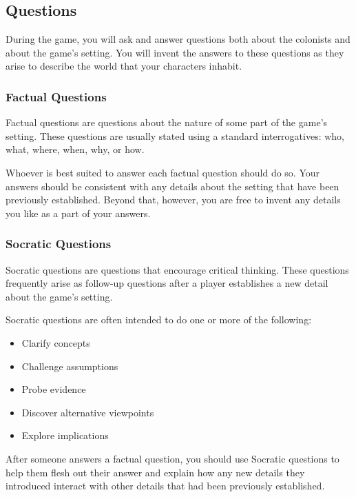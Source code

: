 \documentclass[a6paper, 11pt, parskip=half, DIV=15]{scrartcl}
\begin{document}
\newpage
\enlargethispage{1.75\baselineskip}

\subsection*{Questions}
During the game, you will ask and answer questions both about the colonists and about the game's setting.
You will invent the answers to these questions as they arise to describe the world that your characters inhabit.

\subsubsection*{Factual Questions}
Factual questions are questions about the nature of some part of the game's setting.
These questions are usually stated using a standard interrogatives: who, what, where, when, why, or how.

Whoever is best suited to answer each factual question should do so.
Your answers should be consistent with any details about the setting that have been previously established.
Beyond that, however, you are free to invent any details you like as a part of your answers.

\newpage
\enlargethispage{1.75\baselineskip}

\subsubsection*{Socratic Questions}
Socratic questions are questions that encourage critical thinking.
These questions frequently arise as follow-up questions after a player establishes a new detail about the game's setting.

Socratic questions are often intended to do one or more of the following:
\begin{itemize}[nosep]
	\item Clarify concepts
	\item Challenge assumptions
	\item Probe evidence
	\item Discover alternative viewpoints
	\item Explore implications
\end{itemize}

After someone answers a factual question, you should use Socratic questions to help them flesh out their answer and explain how any new details they introduced interact with other details that had been previously established.
\end{document}
